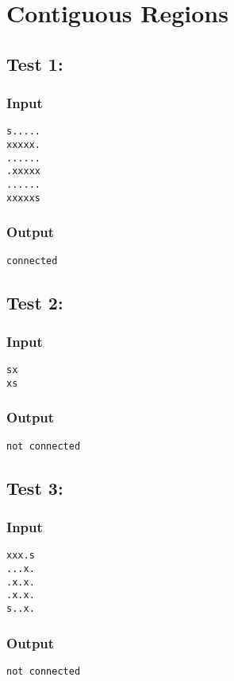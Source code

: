 \documentclass[twocolumn,9pt]{extarticle}
\begin{document}
\section{Contiguous Regions}
\subsection*{Test 1:}
\subsubsection*{Input}
\texttt{s.....\\
xxxxx.\\
......\\
.xxxxx\\
......\\
xxxxxs}

\subsubsection*{Output}
\texttt{connected}

\subsection*{Test 2:}
\subsubsection*{Input}
\texttt{sx\\
xs}

\subsubsection*{Output}
\texttt{not connected}

\subsection*{Test 3:}
\subsubsection*{Input}
\texttt{xxx.s\\
...x.\\
.x.x.\\
.x.x.\\
s..x.}

\subsubsection*{Output}
\texttt{not connected}
\end{document}
